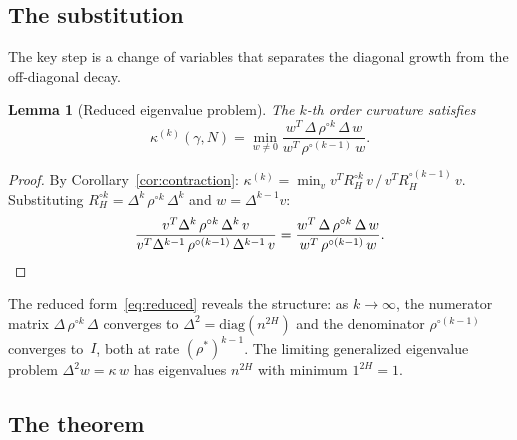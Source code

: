 \documentclass[11pt,a4paper]{article}
\theoremstyle{plain}
\newtheorem{lemma}[theorem]{Lemma}
\theoremstyle{definition}
\theoremstyle{remark}
\begin{document}
\subsection{The substitution}

The key step is a change of variables that separates the
diagonal growth from the off-diagonal decay.

\begin{lemma}[Reduced eigenvalue problem]
\label{lem:substitution}
The $k$-th order curvature satisfies
\begin{equation}\label{eq:reduced}
  \kappa^{(k)}(\gamma,N)
  = \min_{w \neq 0}
    \frac{w^T\,\Delta\,\rho^{\circ k}\,\Delta\,w}
         {w^T\,\rho^{\circ(k-1)}\,w}.
\end{equation}
\end{lemma}

\begin{proof}
By Corollary~\ref{cor:contraction}:
$\kappa^{(k)} = \min_v
v^T R_H^{\circ k}\,v\,/\,v^T R_H^{\circ(k-1)}\,v$.
Substituting $R_H^{\circ k} = \Delta^k\,\rho^{\circ k}\,\Delta^k$
and $w = \Delta^{k-1} v$:
\[
  \frac{v^T \Delta^k\,\rho^{\circ k}\,\Delta^k\,v}
       {v^T \Delta^{k-1}\,\rho^{\circ(k-1)}\,\Delta^{k-1}\,v}
  = \frac{w^T\,\Delta\,\rho^{\circ k}\,\Delta\,w}
         {w^T\,\rho^{\circ(k-1)}\,w}.
  \qedhere
\]
\end{proof}

The reduced form~\eqref{eq:reduced} reveals the structure:
as $k \to \infty$, the numerator matrix
$\Delta\,\rho^{\circ k}\,\Delta$ converges to
$\Delta^2 = \mathrm{diag}(n^{2H})$ and the denominator
$\rho^{\circ(k-1)}$ converges to~$I$, both at rate
$(\rho^*)^{k-1}$.  The limiting generalized eigenvalue
problem $\Delta^2 w = \kappa\,w$ has eigenvalues
$n^{2H}$ with minimum $1^{2H} = 1$.


\subsection{The theorem}
\end{document}
